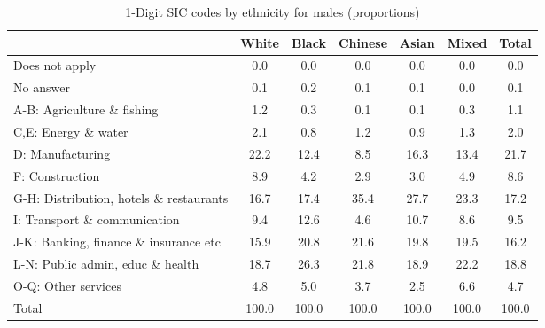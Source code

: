 \begin{table}[htbp]\centering
\def\sym#1{\ifmmode^{#1}\else\(^{#1}\)\fi}
\caption{1-Digit SIC codes by ethnicity for males (proportions)}
\begin{tabular}{l*{6}{c}}
\hline\hline
          &    White&    Black&  Chinese&    Asian&    Mixed&    Total\\
\hline
Does not apply&      0.0&      0.0&      0.0&      0.0&      0.0&      0.0\\
No answer &      0.1&      0.2&      0.1&      0.1&      0.0&      0.1\\
A-B: Agriculture \& fishing&      1.2&      0.3&      0.1&      0.1&      0.3&      1.1\\
C,E: Energy \& water&      2.1&      0.8&      1.2&      0.9&      1.3&      2.0\\
D: Manufacturing&     22.2&     12.4&      8.5&     16.3&     13.4&     21.7\\
F: Construction&      8.9&      4.2&      2.9&      3.0&      4.9&      8.6\\
G-H: Distribution, hotels \& restaurants&     16.7&     17.4&     35.4&     27.7&     23.3&     17.2\\
I: Transport \& communication&      9.4&     12.6&      4.6&     10.7&      8.6&      9.5\\
J-K: Banking, finance \& insurance etc&     15.9&     20.8&     21.6&     19.8&     19.5&     16.2\\
L-N: Public admin, educ \& health&     18.7&     26.3&     21.8&     18.9&     22.2&     18.8\\
O-Q: Other services&      4.8&      5.0&      3.7&      2.5&      6.6&      4.7\\
Total     &    100.0&    100.0&    100.0&    100.0&    100.0&    100.0\\
\hline\hline
\end{tabular}
\end{table}
